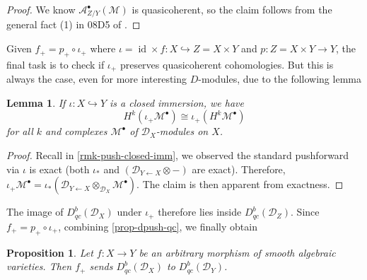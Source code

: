 \documentclass[11pt, a4paper]{article}
\newtheorem{lemma}[theorem]{Lemma}
\newtheorem{proposition}[theorem]{Proposition}
\theoremstyle{definition}
\newcommand{\id}[0]{\operatorname{id}}
\begin{document}
    \begin{proof}
        We know $\mathcal A_{Z/Y}^\bullet(\mathcal M)$ is quasicoherent, so the claim follows from the general fact (1) in 08D5 of \cite{stacks-project}.
    \end{proof}
    Given $f_+=p_+\circ\iota_+$ where $\iota=\id\times f:X\hookrightarrow Z=X\times Y$ and $p:Z=X\times Y\to Y$, the final task is to check if $\iota_+$ preserves quasicoherent cohomologies. But this is always the case, even for more interesting $D$-modules, due to the following lemma
    \begin{lemma}
        If $\iota:X\hookrightarrow Y$ is a closed immersion, we have
        \[H^k(\iota_+\mathcal M^\bullet)\cong\iota_+(H^k\mathcal M^\bullet)\]
        for all $k$ and complexes $\mathcal M^\bullet$ of $\mathcal D_X$-modules on $X$.
    \end{lemma}
    \begin{proof}
        Recall in \cref{rmk-push-closed-imm}, we observed the standard pushforward via $\iota$ is exact (both $\iota_*$ and $(\mathcal D_{Y\leftarrow X}\otimes -)$ are exact). Therefore, $\iota_+\mathcal M^\bullet =\iota_*(\mathcal D_{Y\leftarrow X}\otimes_{\mathcal D_X}\mathcal M^\bullet)$. The claim is then apparent from exactness.
    \end{proof}
    The image of $D^b_{qc}(\mathcal D_X)$ under $\iota_+$ therefore lies inside $D^b_{qc}(\mathcal D_Z)$. Since $f_+=p_+\circ \iota_+$, combining \cref{prop-dpush-qc}, we finally obtain
    \begin{proposition}\label{prop-pushforward-quasicoherent}
        Let $f:X\to Y$ be an arbitrary morphism of smooth algebraic varieties. Then $f_+$ sends $D^b_{qc}(\mathcal D_X)$ to $D^b_{qc}(\mathcal D_Y)$.
    \end{proposition}
\end{document}
